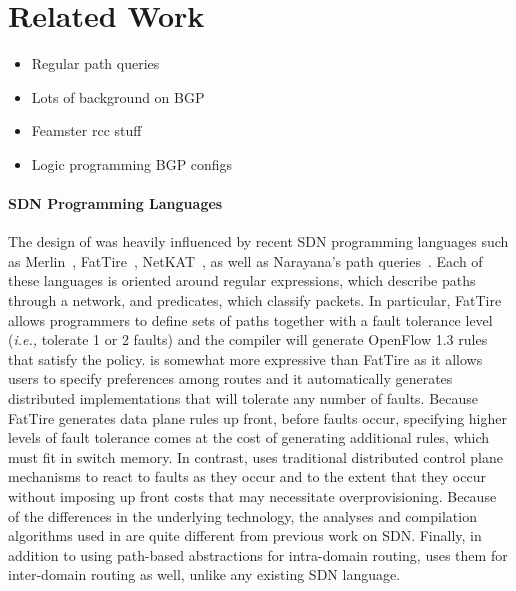 \section{Related Work}

\begin{itemize}
	\item Regular path queries
	\item Lots of background on BGP
	\item Feamster rcc stuff
	\item Logic programming BGP configs
\end{itemize}


\paragraph*{SDN Programming Languages}
The design of \sysname{} was heavily influenced by recent SDN programming
languages such as Merlin~\cite{foster:merlin}, FatTire~\cite{fattire},
NetKAT~\cite{netkat}, as well as Narayana's path queries~\cite{queries}.
Each of these languages is oriented around regular expressions, which
describe paths through a network, and predicates, which classify packets.
In particular, FatTire allows programmers to define sets of paths together
with a fault tolerance level (\emph{i.e.,} tolerate 1 or 2 faults)
and the compiler will generate
OpenFlow 1.3 rules that satisfy the policy.  \sysname is somewhat more
expressive than FatTire as it allows users to specify preferences among
routes and it automatically generates distributed
implementations that will tolerate
any number of faults.  Because FatTire generates data plane rules up front,
before faults occur, specifying higher levels of fault tolerance comes 
at the cost of generating additional rules, which must fit in switch
memory.  In contrast, \sysname uses traditional distributed
control plane mechanisms to react to faults as they occur and to the
extent that they occur without imposing up front costs that may
necessitate overprovisioning.
Because of the differences in the underlying technology, the analyses
and compilation algorithms used in \sysname are quite different from
previous work on SDN.  Finally, in addition to using path-based abstractions
for intra-domain routing, \sysname uses them for inter-domain routing as
well, unlike any existing SDN language.

